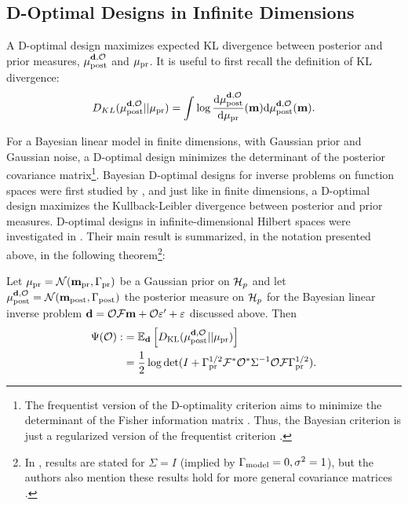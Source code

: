 \subsection{D-Optimal Designs in Infinite Dimensions}\label{subsec:D optimal design} 
A D-optimal design maximizes expected KL divergence between posterior
and prior measures, $\mu_{\textup{post}}^{\mathbf{d}, \mathcal{O}}$ and $\mu_{\textup{pr}}$. It is useful to first recall
the definition of KL divergence:%
$$
D_{KL}(\mu_{\textup{post}}^{\mathbf{d}, \mathcal{O}}||\mu_{\textup{pr}}) = \int \log \frac{\text{\textup{d}} \mu_{\textup{post}}^{\mathbf{d}, \mathcal{O}}}{\text{\textup{d}} \mu_{\textup{pr}}}(\mathbf{m}) \text{\textup{d}} \mu_{\textup{post}}^{\mathbf{d}, \mathcal{O}}(\mathbf{m}).
$$

For a Bayesian linear model in finite dimensions, with Gaussian prior
and Gaussian noise, a D-optimal design minimizes the determinant of
the posterior covariance matrix\footnote{The frequentist version of
the D-optimality criterion aims to minimize the determinant of the
Fisher information matrix \cite[page 16]{Ucinski05}. Thus, the
Bayesian criterion is just a regularized version of the frequentist
criterion \cite{Chaloner1995}.}. Bayesian D-optimal designs for
inverse problems on function spaces were first studied by
\cite{AlexanderianGloorGhattas14, alexanderian2018efficient}, and just like in finite dimensions,
a D-optimal design maximizes the Kullback-Leibler divergence between
posterior and prior measures.
D-optimal designs in infinite-dimensional
Hilbert spaces were investigated in
\cite{AlexanderianGloorGhattas14}. Their main result is summarized, in
the notation presented above, in the following theorem\footnote{In
\cite{AlexanderianGloorGhattas14, alexanderian2018efficient}, results
are stated for $\Sigma=I$ (implied by $\Gamma_{\textup{model}} = 0,\sigma^2=1$), but
the authors also mention these results hold for more general
covariance matrices \cite[p. 681]{AlexanderianGloorGhattas14}.}:
\begin{theorem}\label{thm:d optimality}
  Let $\mu_{\textup{pr}} = \mathcal{N}(\mathbf{m}_{\textup{pr}},\Gamma_{\textup{pr}})$ be a Gaussian prior on $\mathcal{H}_p$
  and let $\mu_{\textup{post}}^{\mathbf{d}, \mathcal{O}} = \mathcal{N}(\mathbf{m}_{\textup{post}},\Gamma_{\textup{post}})$ the posterior measure
  on $\mathcal{H}_p$ for the Bayesian linear inverse problem $\mathbf{d} = \mathcal{O}
  \mathcal{F}\mathbf{m} + \mathcal{O} \varepsilon' + \varepsilon$ discussed above. Then
  \begin{align}\label{eq:objective}
    \begin{split}
      \tar( \obs) :&= \mathbb{E}_{\data}\left [ D_{\text{KL}} (\post || \pr ) \right ] \\
      &= \frac12 \log \det 
      ( I + \prcov^{1/2}  \fwd ^* \obs^* \Sigma^{-1} \obs \fwd \prcov^{1/2}).
    \end{split}
  \end{align}
\end{theorem}
